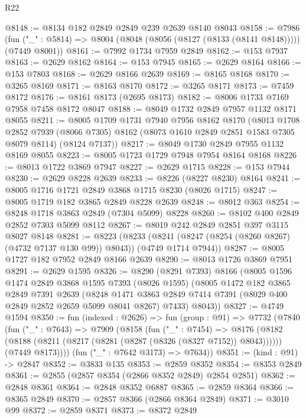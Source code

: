 \begin{lexlean}{R22}
\begin{coremodule}
@8148 := @8134 @182 @2849 @2849 @239 @2639 @8140 @8043
@8158 := @7986
    (fun ("_" : @5814) => @8004 (@8048 (@8056 (@8127 (@8133 (@8141 @8148))))) (@7449 @8001))
@8161 := @7992 @1734 @7959 @2849
@8162 := @153 @7937
@8163 := @2629 @8162
@8164 := @153 @7945
@8165 := @2629 @8164
@8166 := @153 @7803
@8168 := @2629 @8166 @2639
@8169 := @8165 @8168
@8170 := @3265 @8169
@8171 := @8163 @8170
@8172 := @3265 @8171
@8173 := @7459 @8172
@8176 := @8161 @8173 (@2695 @8173)
@8182 := @8006 @1733 @7169 @7958 @7458 @8172 @8047
@8188 := @8049 @1732 @2849 @7957 @1132 @8171 @8055
@8211 := @8005
    @1709
    @1731
    @7940
    @7956
    @8162
    @8170
    (@8013
      @1708
      @2852
      @7939
      (@8066 @7305)
      @8162
      (@8073 @1610 @2849 @2851 @1583 @7305 @8079 @8114)
      (@8124 @7137))
@8217 := @8049 @1730 @2849 @7955 @1132 @8169 @8055
@8223 := @8005 @1723 @1729 @7948 @7954 @8164 @8168
@8226 := @8013 @1722 @3869 @7947
@8227 := @2629 @1715
@8228 := @153 @7944
@8230 := @2629 @8228 @2639
@8233 := @8226 (@8227 @8230) @8164
@8241 := @8005 @1716 @1721 @2849 @3868 @1715 @8230 (@8026 @1715)
@8247 := @8005 @1719 @182 @3865 @2849 @8228 @2639
@8248 := @8012 @363
@8254 := @8248 @1718 @3863 @2849 (@7304 @5099) @8228
@8260 := @8102 @400 @2849 @2852 @7303 @5099 @8112
@8267 := @8019 @242 @2849 @2851 @397 @3115 @8027 @8148
@8281 := @8223
    (@8233 (@8241 (@8247 (@8254 (@8260 @8267) (@4732 @7137 @130 @99)) @8043)) (@4749 @1714 @7944))
@8287 := @8005 @1727 @182 @7952 @2849 @8166 @2639
@8290 := @8013 @1726 @3869 @7951
@8291 := @2629 @1595
@8326 := @8290
    (@8291 @7393)
    @8166
    (@8005
      @1596
      @1474
      @2849
      @3868
      @1595
      @7393
      (@8026 @1595)
      (@8005
        @1472
        @182
        @3865
        @2849
        @7391
        @2639
        (@8248 @1471 @3863 @2849 @7414 @7391 (@8029 @400 @2849 @2852 @2659 @5099 @8041 @8267) @7433)
        @8043))
@8327 := @4749 @1594
@8350 := fun (indexed : @2626) =>
  fun (group : @91) =>
  @7732
    (@7840
      (fun ("_" : @7643) =>
      @7909
        (@8158
          (fun ("_" : @7454) =>
          @8176
            (@8182 (@8188 (@8211 (@8217 (@8281 (@8287 (@8326 (@8327 @7152)) @8043))))))
            (@7449 @8173))))
      (fun ("_" : @7642 @3173) => @7634))
@8351 := (kind : @91) -> @2847
@8352 := @3833 @135
@8353 := @2859 @8352
@8354 := @8353 @2849
@8361 := @2855 (@2857 @8354 (@2866 @8352 @2849) @2854 @2851)
@8362 := @2848 @8361
@8364 := @2848 @8352 @6887
@8365 := @2859 @8364
@8366 := @8365 @2849
@8370 := @2857 @8366 (@2866 @8364 @2849)
@8371 := @3010 @99
@8372 := @2859 @8371
@8373 := @8372 @2849

\end{coremodule}
\end{lexlean}
